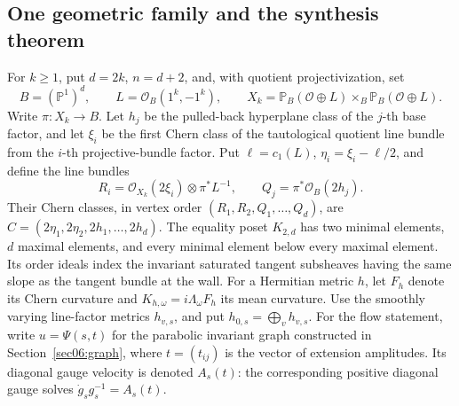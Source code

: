 \documentclass[11pt]{amsart}
\theoremstyle{definition}
\theoremstyle{remark}
\newcommand{\PP}{\mathbb P}
\newcommand{\cO}{\mathcal O}
\begin{document}
\subsection*{One geometric family and the synthesis theorem}
For \(k\ge1\), put \(d=2k\), \(n=d+2\), and, with quotient
projectivization, set
\[
 B=(\PP^1)^d,\qquad L=\cO_B(1^k,-1^k),\qquad
 X_k=\PP_B(\cO\oplus L)\times_B\PP_B(\cO\oplus L).
\]
Write \(\pi:X_k\to B\). Let \(h_j\) be the pulled-back hyperplane
class of the \(j\)-th base factor, and let \(\xi_i\) be the first
Chern class of the tautological quotient line bundle from the
\(i\)-th projective-bundle factor. Put \(\ell=c_1(L)\),
\(\eta_i=\xi_i-\ell/2\), and define the line bundles
\[
 R_i=\cO_{X_k}(2\xi_i)\otimes\pi^*L^{-1},\qquad
 Q_j=\pi^*\cO_B(2h_j).
\]
Their Chern classes, in vertex order \((R_1,R_2,Q_1,\ldots,Q_d)\),
are \(C=(2\eta_1,2\eta_2,2h_1,\ldots,2h_d)\).
The equality poset \(K_{2,d}\) has two minimal elements, \(d\)
maximal elements, and every minimal element below every maximal
element. Its order ideals index the invariant saturated tangent
subsheaves having the same slope as the tangent bundle at the wall.
For a Hermitian metric \(h\), let \(F_h\) denote its Chern curvature
and \(K_{h,\omega}=i\Lambda_\omega F_h\) its mean curvature.
Use the smoothly varying line-factor metrics \(h_{v,s}\), and put
\(h_{0,s}=\bigoplus_vh_{v,s}\). For the flow statement, write
\(u=\Psi(s,t)\) for the parabolic invariant graph constructed in
Section~\ref{sec06:graph}, where \(t=(t_{ij})\) is the vector of
extension amplitudes. Its diagonal gauge velocity is denoted
\(A_s(t)\): the corresponding positive diagonal gauge solves
\(\dot g_sg_s^{-1}=A_s(t)\).
\end{document}
